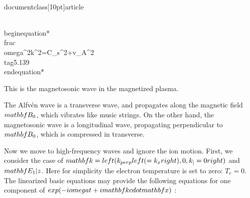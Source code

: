 \\documentclass[10pt]{article}
\begin{document}
{{{{\\begin{equation*}
\\frac{\\omega^{2}}{k^{2}}=C_{s}^{2}+v_{A}^{2} \\tag{5.139}
\\end{equation*}


This is the magnetosonic wave in the magnetized plasma.

The Alfvén wave is a transverse wave, and propagates along the magnetic field $\\mathbf{B}_{0}$, which vibrates like music strings. On the other hand, the magnetosonic wave is a longitudinal wave, propagating perpendicular to $\\mathbf{B}_{0}$, which is compressed in transverse.

Now we move to high-frequency waves and ignore the ion motion. First, we consider the case of $\\mathbf{k}=\\left(k_{\\perp}\\left(=k_{x}\\right), 0, k_{\\|}=0\\right)$ and $\\mathbf{E}_{1} \\| z$. Here for simplicity the electron temperature is set to zero: $T_{e}=0$. The linearized basic equations may provide the following equations for one component of $\\exp (-i \\omega t+i \\mathbf{k} \\cdot \\mathbf{x})$ :


}}}}
\end{document}
